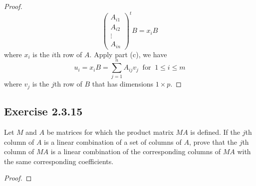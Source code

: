 \begin{enumerate}
\begin{proof}
\[\begin{pmatrix}
            {A}_{i1 } \\ 
            {A}_{i2} \\
            \vdots \\
            {A}_{in }
        \end{pmatrix}^{t} B = {x}_{i} B  \]
        where \( {x}_{i}  \) is the \( i   \)th row of \( A  \). Apply part (c), we have
        \[  {u}_{i} = {x}_{i} B = \sum_{ j=1  }^{ n } {A}_{ij} {v}_{j} \ \text{ for } \  1 \leq i \leq m \]
        where \( {v}_{j}  \) is the \( j \)th row of \( B  \) that has dimensions \( 1 \times  p  \).
        \end{proof}

\end{enumerate}


\subsection*{Exercise 2.3.15} Let \( M  \) and \( A  \) be matrices for which the product matrix \( MA  \) is defined. If the \( j \)th column of \( A  \) is a linear combination of a set of columns of \( A  \), prove that the \( j \)th column of \( MA  \) is a linear combination of the corresponding columns of \( MA  \) with the same corresponding coefficients.
\begin{proof}

\end{proof}

